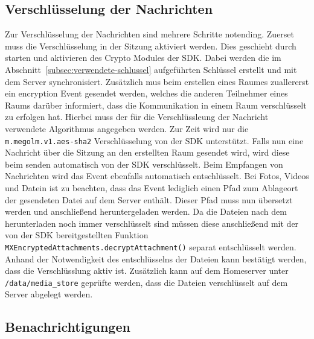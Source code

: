     \subsection{Verschlüsselung der Nachrichten}\label{subsec:verschlusselung-der-nachrichten}
    Zur Verschlüsselung der Nachrichten sind mehrere Schritte notending.
    Zuerset muss die Verschlüsselung in der Sitzung aktiviert werden.
    Dies geschieht durch starten und aktivieren des Crypto Modules der SDK.
    Dabei werden die im Abschnitt~\ref{subsec:verwendete-schlussel} aufgeführten Schlüssel erstellt und mit dem Server synchronisiert.
    Zusätzlich mus beim erstellen eines Raumes zuallererst ein encryption Event gesendet werden, welches die anderen Teilnehmer eines Raums darüber informiert, dass die Kommunikation in einem Raum verschlüsselt zu erfolgen hat.
    Hierbei muss der für die Verschlüssleung der Nachricht verwendete Algorithmus angegeben werden.
    Zur Zeit wird nur die \texttt{m.megolm.v1.aes-sha2} Verschlüsselung von der SDK unterstützt.
    Falls nun eine Nachricht über die Sitzung an den erstellten Raum gesendet wird, wird diese beim senden automatisch von der SDK verschlüsselt.
    Beim Empfangen von Nachrichten wird das Event ebenfalls automatisch entschlüsselt.
    Bei Fotos, Videos und Datein ist zu beachten, dass das Event lediglich einen Pfad zum Ablageort der gesendeten Datei auf dem Server enthält.
    Dieser Pfad muss nun übersetzt werden und anschließend heruntergeladen werden.
    Da die Dateien nach dem herunterladen noch immer verschlüsselt sind müssen diese anschließend mit der von der SDK bereitgestellten Funktion \texttt{MXEncryptedAttachments.decryptAttachment()} separat entschlüsselt werden.
    Anhand der Notwendigkeit des entschlüsselns der Dateien kann bestätigt werden, dass die Verschlüsslung aktiv ist.
    Zusätzlich kann auf dem Homeserver unter \texttt{/data/media\_store} geprüfte werden, dass die Dateien verschlüsselt auf dem Server abgelegt werden.

    \subsection{Benachrichtigungen}\label{subsec:benachrichtigungen}


    \newpage
